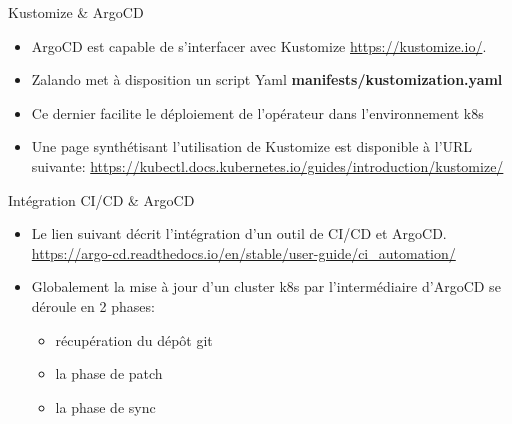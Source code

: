 
\begin{frame}[fragile]{Kustomize \& ArgoCD}

\begin{itemize}
   \item ArgoCD est capable de s'interfacer avec Kustomize \url{https://kustomize.io/}.
   \item Zalando met à disposition un script Yaml \textbf{manifests/kustomization.yaml}
   \item Ce dernier facilite le déploiement de l'opérateur dans l'environnement k8s
   \item Une page synthétisant l'utilisation de Kustomize est disponible à l'URL suivante: \url{https://kubectl.docs.kubernetes.io/guides/introduction/kustomize/}
\end{itemize}

\end{frame}


\begin{frame}[fragile]{Intégration CI/CD \& ArgoCD}

\begin{itemize}
   \item Le lien suivant décrit l'intégration d'un outil de CI/CD et ArgoCD. \url{https://argo-cd.readthedocs.io/en/stable/user-guide/ci_automation/}
   \item Globalement la mise à jour d'un cluster k8s par l'intermédiaire d'ArgoCD se déroule en 2 phases:
   \begin{itemize}
      \item récupération du dépôt git
      \item la phase de patch
      \item la phase de sync
   \end{itemize}
\end{itemize}

\end{frame}


